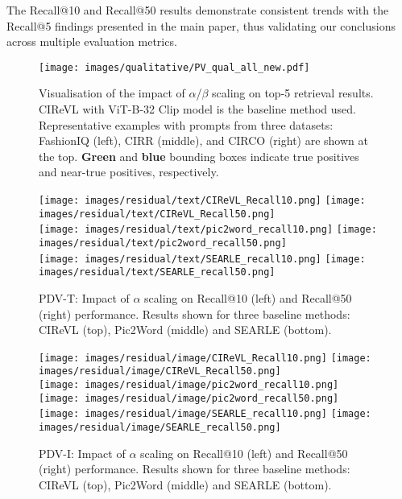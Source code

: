 The Recall@10 and Recall@50 results demonstrate consistent trends with the Recall@5 findings presented in the main paper, thus validating our conclusions across multiple evaluation metrics.

\begin{figure*}[!b]
	\centering
	\texttt{[image: images/qualitative/PV\_qual\_all\_new.pdf]}
	\caption{Visualisation of the impact of $\alpha$/$\beta$ scaling on top-5 retrieval results. CIReVL with ViT-B-32 Clip model is the baseline method used. Representative examples with prompts from three datasets: FashionIQ (left), CIRR (middle), and CIRCO (right) are shown at the top. \textbf{\textcolor{boxgreen}{Green}} and \textbf{\textcolor{boxblue}{blue}} bounding boxes indicate true positives and near-true positives, respectively.}
	\label{fig:residual_qual_full}
	
\end{figure*}


\begin{figure*}[!h]
	\centering
	\texttt{[image: images/residual/text/CIReVL\_Recall10.png]}
	\texttt{[image: images/residual/text/CIReVL\_Recall50.png]}
	\\
	\texttt{[image: images/residual/text/pic2word\_recall10.png]}
	\texttt{[image: images/residual/text/pic2word\_recall50.png]}
	\\
	\texttt{[image: images/residual/text/SEARLE\_recall10.png]}
	\texttt{[image: images/residual/text/SEARLE\_recall50.png]}
	\caption{PDV-T: Impact of $\alpha$ scaling on Recall@10 (left) and Recall@50 (right) performance. Results shown for three baseline methods: CIReVL (top), Pic2Word (middle) and SEARLE (bottom).}
	\label{fig:residual_text}
\end{figure*}

\begin{figure*}[!h]
	\centering
	\texttt{[image: images/residual/image/CIReVL\_Recall10.png]}
	\texttt{[image: images/residual/image/CIReVL\_Recall50.png]}
	\\
	\texttt{[image: images/residual/image/pic2word\_recall10.png]}
	\texttt{[image: images/residual/image/pic2word\_recall50.png]}
	\\
	\texttt{[image: images/residual/image/SEARLE\_recall10.png]}
	\texttt{[image: images/residual/image/SEARLE\_recall50.png]}
	\caption{PDV-I: Impact of $\alpha$ scaling on Recall@10 (left) and Recall@50 (right) performance. Results shown for three baseline methods: CIReVL (top), Pic2Word (middle) and SEARLE (bottom).}
	\label{fig:residual_image}
\end{figure*}


